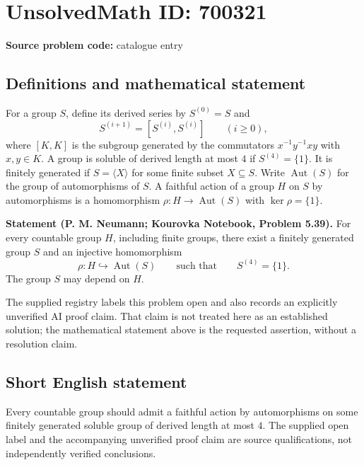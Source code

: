 \documentclass[11pt]{article}
\begin{document}
\section*{UnsolvedMath ID: 700321}
\textbf{Source problem code:} catalogue entry
\subsection{Definitions and mathematical statement}
For a group \(S\), define its derived series by \(S^{(0)}=S\) and
\[
S^{(i+1)}=[S^{(i)},S^{(i)}]\qquad(i\geq 0),
\]
where \([K,K]\) is the subgroup generated by the commutators \(x^{-1}y^{-1}xy\) with \(x,y\in K\). A group is soluble of derived length at most \(4\) if \(S^{(4)}=\{1\}\). It is finitely generated if \(S=\langle X\rangle\) for some finite subset \(X\subseteq S\). Write \(\operatorname{Aut}(S)\) for the group of automorphisms of \(S\). A faithful action of a group \(H\) on \(S\) by automorphisms is a homomorphism \(\rho:H\to\operatorname{Aut}(S)\) with \(\ker\rho=\{1\}\).

\textbf{Statement (P. M. Neumann; Kourovka Notebook, Problem 5.39).} For every countable group \(H\), including finite groups, there exist a finitely generated group \(S\) and an injective homomorphism
\[
\rho:H\hookrightarrow\operatorname{Aut}(S)
\qquad\text{such that}\qquad S^{(4)}=\{1\}.
\]
The group \(S\) may depend on \(H\).

The supplied registry labels this problem open and also records an explicitly unverified AI proof claim. That claim is not treated here as an established solution; the mathematical statement above is the requested assertion, without a resolution claim.
\subsection{Short English statement}
Every countable group should admit a faithful action by automorphisms on some finitely generated soluble group of derived length at most \(4\). The supplied open label and the accompanying unverified proof claim are source qualifications, not independently verified conclusions.
\end{document}
